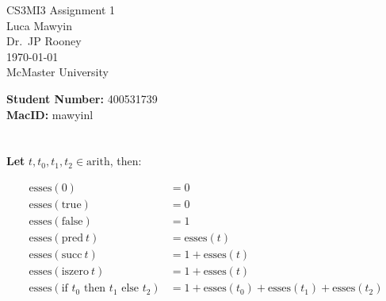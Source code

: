 \documentclass[letterpaper]{article}
\theoremstyle{plain}
\theoremstyle{definition}
\theoremstyle{remark}
\begin{document}

\begin{titlepage}
    \centering
    \vspace*{3cm}
    
    {\Huge CS3MI3 Assignment 1}\\[2cm]
    
    {\large Luca Mawyin}\\[0.5cm]
    
    {\large Dr.\ JP Rooney}\\[0.5cm]

    {\large \today}\\[2cm]

    {\Large McMaster University}

    \vfill
    \begin{flushleft}

        {\large \textbf{Student Number: }400531739}\\[0.5cm]
        {\large \textbf{MacID:} mawyinl}
    \end{flushleft}

\end{titlepage}

\renewcommand{\thesection}{Question \arabic{section}}

\section{}

\textbf{Let} $t,t_0,t_1,t_2\in\text{arith}$, then:

\begin{align*}
    \text{esses}(0)&=0\\
    \text{esses}(\text{true})&=0\\
    \text{esses}(\text{false})&=1\\
    \text{esses}(\text{pred}~t)&=\text{esses}(t)\\
    \text{esses}(\text{succ}~t)&=1+\text{esses}(t)\\
    \text{esses}(\text{iszero}~t)&=1+\text{esses}(t)\\
    \text{esses}(\text{if $t_0$ then $t_1$ else $t_2$})&=1+\text{esses}(t_0)+\text{esses}(t_1)+\text{esses}(t_2)
\end{align*}

\section{}
\end{document}
